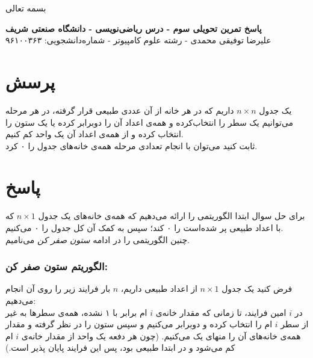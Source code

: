 \documentclass[12pt,a4paper]{article}
\begin{document}
\begin{center}
	بسمه تعالی
\end{center}
\begin{center}
	\textbf{پاسخ تمرین تحویلی سوم - درس ریاضی‌نویسی - دانشگاه صنعتی شریف}
	\\
	علیرضا توفیقی محمدی - رشته علوم کامپیوتر - شماره‌دانشجویی: ۹۶۱۰۰۳۶۳
\end{center}
\section*{پرسش}
یک جدول 
$n \times n$
داریم که در هر خانه از آن عددی طبیعی قرار گرفته، در هر مرحله می‌توانیم یک سطر را انتخاب‌کرده و همه‌ی اعداد آن را دوبرابر کرده یا یک ستون را انتخاب کرده و از همه‌ی اعداد آن یک واحد کم کنیم.
\\
ثابت کنید می‌توان با انجام تعدادی مرحله همه‌ی خانه‌های جدول را ۰ کرد.
\section*{پاسخ}
برای حل سوال ابتدا الگوریتمی را ارائه می‌دهیم که همه‌ی خانه‌های یک جدول 
$n \times 1$
که با اعداد طبیعی پر شده‌است را ۰ کند؛ سپس به کمک آن کل جدول را ۰ می‌کنیم.
\\
چنین الگوریتمی را در ادامه \textit{ستون صفر کن} می‌نامیم.

\subsubsection*{الگوریتم ستون صفر کن:}
فرض کنید یک جدول $n \times 1$ از اعداد طبیعی داریم، $n$ بار فرایند زیر را روی آن انجام می‌دهیم:
\\
در $i$ امین فرایند، تا زمانی که مقدار خانه‌ی $i$ ام برابر با ۱ نشده، همه‌ی سطر‌ها به غیر از سطر $i$ ام را انتخاب کرده و دوبرابر می‌کنیم و سپس ستون را در نظر گرفته و مقدار همه‌ی خانه‌های آن را منهای یک می‌کنیم.
(چون هر دفعه یک واحد از مقدار خانه‌ی $i$ ام کم می‌شود و در ابتدا طبیعی بود، پس این فرایند پایان پذیر است.)
\end{document}

